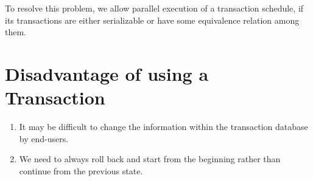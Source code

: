 \documentclass{article}
\begin{document}
To resolve this problem, we allow parallel execution of a transaction schedule, if its transactions are either serializable or have some equivalence relation among them.

\section{Disadvantage of using a Transaction} 

\begin{enumerate}

\item It may be difficult to change the information within the transaction database by end-users.
\item We need to always roll back and start from the beginning rather than continue from the previous state.

\end{enumerate}
\end{document}
